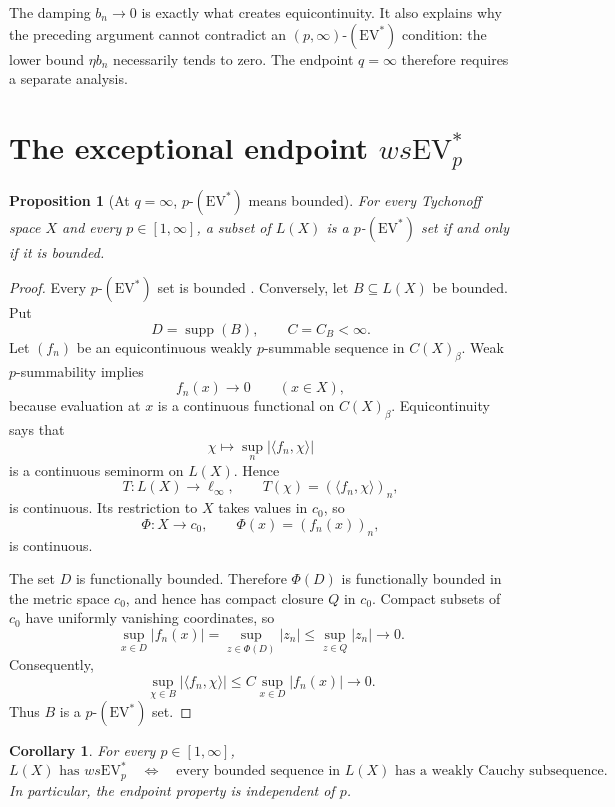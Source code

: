 \documentclass[11pt]{article}
\newtheorem{proposition}[theorem]{Proposition}
\newtheorem{corollary}[theorem]{Corollary}
\newcommand{\supp}{\operatorname{supp}}
\newcommand{\EV}{\mathrm{EV}}
\begin{document}
The damping $b_n\to0$ is exactly what creates equicontinuity.  It also explains
why the preceding argument cannot contradict an $(p,\infty)$-$(\EV^*)$
condition: the lower bound $\eta b_n$ necessarily tends to zero.  The endpoint
$q=\infty$ therefore requires a separate analysis.

\section{The exceptional endpoint \texorpdfstring{$ws\EV^*_p$}{wsEV-p}}

\begin{proposition}[At $q=\infty$, $p$-$(\EV^*)$ means bounded]
\label{prop:evbounded}
For every Tychonoff space $X$ and every $p\in[1,\infty]$, a subset of $L(X)$ is
a $p$-$(\EV^*)$ set if and only if it is bounded.
\end{proposition}

\begin{proof}
Every $p$-$(\EV^*)$ set is bounded
\cite[Lemma~7.2]{GabriyelyanPelczynski}.  Conversely, let $B\subseteq L(X)$ be
bounded.  Put
\[
  D=\supp(B),
  \qquad C=C_B<\infty.
\]
Let $(f_n)$ be an equicontinuous weakly $p$-summable sequence in
$C(X)_\beta$.  Weak $p$-summability implies
\[
  f_n(x)\longrightarrow0
  \qquad(x\in X),
\]
because evaluation at $x$ is a continuous functional on $C(X)_\beta$.
Equicontinuity says that
\[
  \chi\longmapsto\sup_n|\langle f_n,\chi\rangle|
\]
is a continuous seminorm on $L(X)$.  Hence
\[
  T:L(X)\longrightarrow\ell_\infty,
  \qquad T(\chi)=(\langle f_n,\chi\rangle)_n,
\]
is continuous.  Its restriction to $X$ takes values in $c_0$, so
\[
  \Phi:X\longrightarrow c_0,
  \qquad \Phi(x)=(f_n(x))_n,
\]
is continuous.

The set $D$ is functionally bounded.  Therefore $\Phi(D)$ is functionally
bounded in the metric space $c_0$, and hence has compact closure $Q$ in $c_0$.
Compact subsets of $c_0$ have uniformly vanishing coordinates, so
\[
  \sup_{x\in D}|f_n(x)|
  =\sup_{z\in\Phi(D)}|z_n|
  \leq\sup_{z\in Q}|z_n|
  \longrightarrow0.
\]
Consequently,
\[
  \sup_{\chi\in B}|\langle f_n,\chi\rangle|
  \leq C\sup_{x\in D}|f_n(x)|
  \longrightarrow0.
\]
Thus $B$ is a $p$-$(\EV^*)$ set.
\end{proof}

\begin{corollary}\label{cor:endpoint-wcsp}
For every $p\in[1,\infty]$,
\[
  L(X)\text{ has }ws\EV^*_p
  \quad\Longleftrightarrow\quad
  \text{every bounded sequence in }L(X)\text{ has a weakly Cauchy subsequence}.
\]
In particular, the endpoint property is independent of $p$.
\end{corollary}
\end{document}
